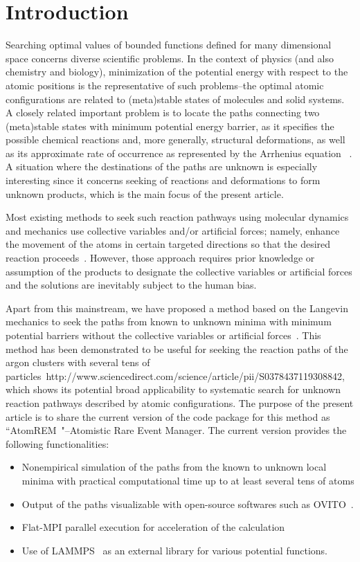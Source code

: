 \documentclass[preprint,12pt]{elsarticle}
\begin{document}
\section{Introduction}
Searching optimal values of bounded functions defined for many dimensional space concerns diverse scientific problems. In the context of physics (and also chemistry and biology), minimization of the potential energy with respect to the atomic positions is the representative of such problems--the optimal atomic configurations are related to (meta)stable states of molecules and solid systems. A closely related important problem is to locate the paths connecting two (meta)stable states with minimum potential energy barrier, as it specifies the possible chemical reactions and, more generally, structural deformations, as well as its approximate rate of 
occurrence as represented by the Arrhenius equation~\cite{Laidler-text} . A situation where the destinations of the paths are unknown is especially interesting since it concerns seeking of reactions and deformations to form unknown products, which is the main focus of the present article.

Most existing methods to seek such reaction pathways using molecular dynamics and mechanics use collective variables and/or artificial forces; namely, enhance the movement of the atoms in certain targeted directions so that the desired reaction proceeds~\cite{Carter-Ciccotti-bluemoon,Sprik-Ciccotti-bluemoon,Schlitter-Wollmer-targetedMD,SteeredMD-orig-Sci1996,Voter-hyperdyn-JCP1997,Voter-hyperdyn-PRL1997,Laio01102002,Darve-ABF-JCP2001}. However, those approach requires prior knowledge or assumption of the products to designate the collective variables or artificial forces and the solutions are inevitably subject to the human bias.
  
Apart from this mainstream, we have proposed a method based on the Langevin mechanics to seek the paths from known to unknown minima with minimum potential barriers without the collective variables or artificial forces~\cite{Akashi}. This method has been demonstrated to be useful for seeking the reaction paths of the argon clusters with several tens of particles~http://www.sciencedirect.com/science/article/pii/S0378437119308842, which shows its potential broad applicability to systematic search for unknown reaction pathways described by atomic configurations. The purpose of the present article is to share the current version of the code package for this method as ``AtomREM~\cite{AtomREM}"--Atomistic Rare Event Manager. The current version provides the following functionalities:
\begin{itemize}
\item Nonempirical simulation of the paths from the known to unknown local minima with practical computational time up to at least several tens of atoms
\item Output of the paths visualizable with open-source softwares such as OVITO~\cite{Stukowski_2009,OVITO}.
\item Flat-MPI parallel execution for acceleration of the calculation
\item Use of LAMMPS~\cite{LAMMPS} as an external library for various potential functions.
\end{itemize}
\end{document}
